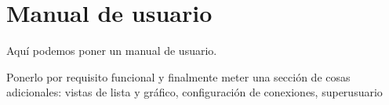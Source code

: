\chapter{Manual de usuario}

Aquí podemos poner un manual de usuario.

Ponerlo por requisito funcional y finalmente meter una sección de cosas adicionales: vistas de lista y gráfico, configuración de conexiones, superusuario